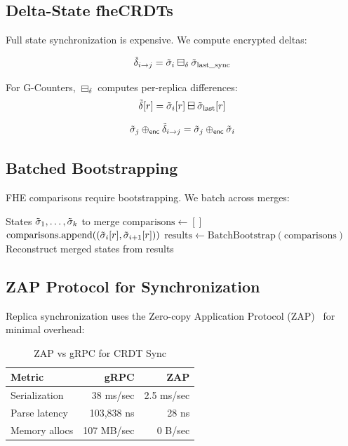 \documentclass{../shared/luxfhe}
\begin{document}
\subsection{Delta-State fheCRDTs}

Full state synchronization is expensive. We compute encrypted deltas:

\begin{definition}
\[
\tilde{\delta}_{i \to j} = \tilde{\sigma}_i \boxminus_\delta \tilde{\sigma}_{\text{last\_sync}}
\]
\end{definition}

For G-Counters, $\boxminus_\delta$ computes per-replica differences:
\[
\tilde{\delta}[r] = \tilde{\sigma}_i[r] \boxminus \tilde{\sigma}_{\text{last}}[r]
\]

\begin{theorem}
\[
\tilde{\sigma}_j \oplus_{\mathsf{enc}} \tilde{\delta}_{i \to j} = \tilde{\sigma}_j \oplus_{\mathsf{enc}} \tilde{\sigma}_i
\]
\end{theorem}

\subsection{Batched Bootstrapping}

FHE comparisons require bootstrapping. We batch across merges:

\begin{algorithm}
\caption{Batched fheCRDT Merge}
\begin{algorithmic}[1]
\Require States $\tilde{\sigma}_1, \ldots, \tilde{\sigma}_k$ to merge
\State $\text{comparisons} \gets []$
        \State $\text{comparisons}.\text{append}((\tilde{\sigma}_i[r], \tilde{\sigma}_{i+1}[r]))$
    \EndFor
\EndFor
\State $\text{results} \gets \text{BatchBootstrap}(\text{comparisons})$ 
\State Reconstruct merged states from results
\end{algorithmic}
\end{algorithm}

\subsection{ZAP Protocol for Synchronization}

Replica synchronization uses the Zero-copy Application Protocol (ZAP)~\cite{zap} for minimal overhead:

\begin{table}[h]
\centering
\caption{ZAP vs gRPC for CRDT Sync}
\begin{tabular}{lrr}
\toprule
Metric & gRPC & ZAP \\
\midrule
Serialization & 38 ms/sec & 2.5 ms/sec \\
Parse latency & 103,838 ns & 28 ns \\
Memory allocs & 107 MB/sec & 0 B/sec \\
\bottomrule
\end{tabular}
\end{table}
\end{document}
